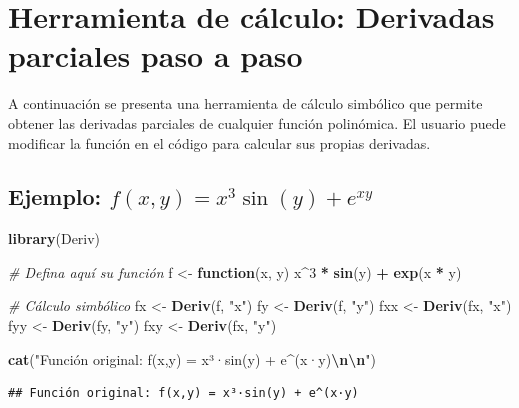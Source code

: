 \documentclass[
]{book}
\newenvironment{Shaded}{\begin{snugshade}}{\end{snugshade}}
\newcommand{\CommentTok}[1]{\textcolor[rgb]{0.56,0.35,0.01}{\textit{#1}}}
\newcommand{\ControlFlowTok}[1]{\textcolor[rgb]{0.13,0.29,0.53}{\textbf{#1}}}
\newcommand{\DecValTok}[1]{\textcolor[rgb]{0.00,0.00,0.81}{#1}}
\newcommand{\FunctionTok}[1]{\textcolor[rgb]{0.13,0.29,0.53}{\textbf{#1}}}
\newcommand{\NormalTok}[1]{#1}
\newcommand{\OtherTok}[1]{\textcolor[rgb]{0.56,0.35,0.01}{#1}}
\newcommand{\SpecialCharTok}[1]{\textcolor[rgb]{0.81,0.36,0.00}{\textbf{#1}}}
\newcommand{\StringTok}[1]{\textcolor[rgb]{0.31,0.60,0.02}{#1}}
\begin{document}
\section{Herramienta de cálculo: Derivadas parciales paso a paso}\label{herramienta-de-cuxe1lculo-derivadas-parciales-paso-a-paso}

A continuación se presenta una herramienta de cálculo simbólico que permite obtener las derivadas parciales de cualquier función polinómica. El usuario puede modificar la función en el código para calcular sus propias derivadas.

\subsection{\texorpdfstring{Ejemplo: \(f(x, y) = x^3 \sin(y) + e^{xy}\)}{Ejemplo: f(x, y) = x\^{}3 \textbackslash sin(y) + e\^{}\{xy\}}}\label{ejemplo-fx-y-x3-siny-exy}

\begin{Shaded}
\begin{Highlighting}[]
\FunctionTok{library}\NormalTok{(Deriv)}

\CommentTok{\# Defina aquí su función}
\NormalTok{f }\OtherTok{\textless{}{-}} \ControlFlowTok{function}\NormalTok{(x, y) x}\SpecialCharTok{\^{}}\DecValTok{3} \SpecialCharTok{*} \FunctionTok{sin}\NormalTok{(y) }\SpecialCharTok{+} \FunctionTok{exp}\NormalTok{(x }\SpecialCharTok{*}\NormalTok{ y)}

\CommentTok{\# Cálculo simbólico}
\NormalTok{fx }\OtherTok{\textless{}{-}} \FunctionTok{Deriv}\NormalTok{(f, }\StringTok{"x"}\NormalTok{)}
\NormalTok{fy }\OtherTok{\textless{}{-}} \FunctionTok{Deriv}\NormalTok{(f, }\StringTok{"y"}\NormalTok{)}
\NormalTok{fxx }\OtherTok{\textless{}{-}} \FunctionTok{Deriv}\NormalTok{(fx, }\StringTok{"x"}\NormalTok{)}
\NormalTok{fyy }\OtherTok{\textless{}{-}} \FunctionTok{Deriv}\NormalTok{(fy, }\StringTok{"y"}\NormalTok{)}
\NormalTok{fxy }\OtherTok{\textless{}{-}} \FunctionTok{Deriv}\NormalTok{(fx, }\StringTok{"y"}\NormalTok{)}

\FunctionTok{cat}\NormalTok{(}\StringTok{"Función original: f(x,y) = x³·sin(y) + e\^{}(x·y)}\SpecialCharTok{\textbackslash{}n\textbackslash{}n}\StringTok{"}\NormalTok{)}
\end{Highlighting}
\end{Shaded}

\begin{verbatim}
## Función original: f(x,y) = x³·sin(y) + e^(x·y)
\end{verbatim}
\end{document}
